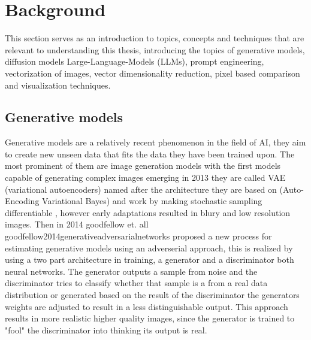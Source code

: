 \documentclass[
  a4paper,  %
  twoside,  %
  bibliography=totoc,
  headsepline,
  cleardoublepage=empty,
  parskip=half,
  draft=false
]{scrbook}
\begin{document}
\chapter{Background}
\label{chap:k2}
This section serves as an introduction to topics, concepts and techniques that are relevant to understanding this thesis, introducing the topics of generative models, diffusion models Large-Language-Models (LLMs), prompt engineering, vectorization of images, vector dimensionality reduction, pixel based comparison and visualization techniques. 
\section{Generative models}


Generative models are a relatively recent phenomenon in the field of AI, they aim to create new unseen data that fits the data they have been trained upon. The most prominent of them are image generation models with the first models capable of generating complex images emerging in 2013 they are called VAE (variational autoencoders) named after the architecture they are based on (Auto-Encoding Variational Bayes) and work by making stochastic sampling differentiable \cite{kingma2022autoencodingvariationalbayes}, however early adaptations resulted in blury and low resolution images.
Then in 2014 goodfellow et. all {goodfellow2014generativeadversarialnetworks} proposed a new process for estimating generative models using an adverserial approach, this is realized by using a two part architecture in training, a generator and a discriminator both neural networks. The generator outputs a sample from noise and the discriminator tries to classify whether that sample is a from a real data distribution or generated based on the result of the discriminator the generators weights are adjusted to result in a less distinguishable output. This approach results in more realistic higher quality images, since the generator is trained to "fool" the discriminator into thinking its output is real. 
\end{document}
